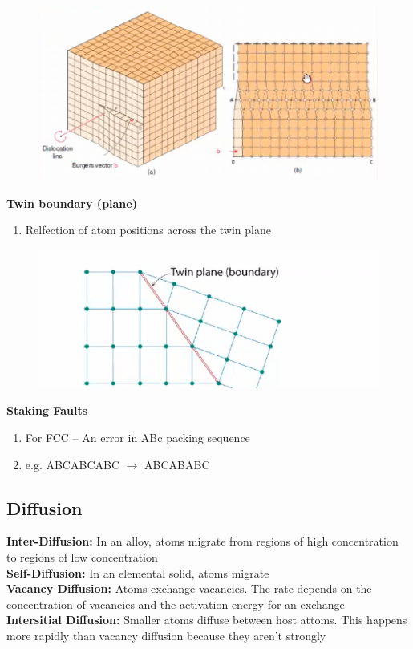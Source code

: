 \documentclass{article}
\begin{document}
    \begin{figure}[H]
        \centering
        \includegraphics[width=\textwidth]{images/Screw.png}
    \end{figure}
    \textbf{Twin boundary (plane)}
    \begin{enumerate}
        \item Relfection of atom positions across the twin plane
    \end{enumerate}
    \begin{figure}[H]
        \centering
        \includegraphics[width=\textwidth]{images/Twin.png}
    \end{figure}
    \textbf{Staking Faults}
    \begin{enumerate}
        \item For FCC – An error in ABc packing sequence
        \item e.g. ABCABCABC $\rightarrow$ ABCABABC
    \end{enumerate}
    \pagebreak
    \subsection{Diffusion}
    \textbf{Inter-Diffusion:} 
    In an alloy, atoms migrate from regions of high 
    concentration to regions of low concentration \\
    \textbf{Self-Diffusion:} 
    In an elemental solid, atoms migrate \\
    \textbf{Vacancy Diffusion:}
    Atoms exchange vacancies. The rate depends on the concentration
    of vacancies and the activation energy for an exchange \\
    \textbf{Intersitial Diffusion:}
    Smaller atoms diffuse between host attoms. This happens more rapidly than vacancy
    diffusion because they aren't strongly 
\end{document}
